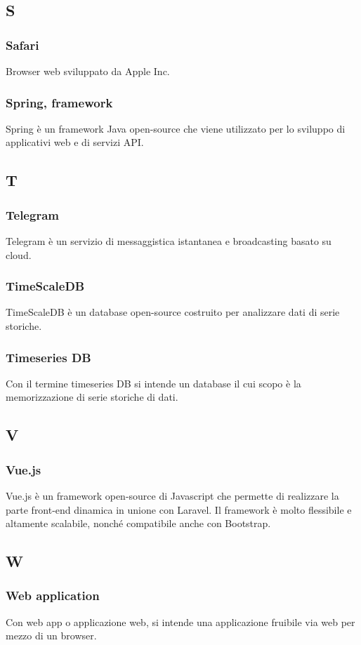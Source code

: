 \subsection{S}
\subsubsection{Safari}
Browser web sviluppato da Apple Inc.
\subsubsection{Spring, framework}  Spring è un framework Java open-source che viene utilizzato per lo sviluppo di applicativi web e di servizi API.
\subsection{T}
\subsubsection{Telegram}  Telegram è un servizio di messaggistica istantanea e broadcasting basato su cloud.
\subsubsection{TimeScaleDB}  TimeScaleDB è un database open-source costruito per analizzare dati di serie storiche.
\subsubsection{Timeseries DB}  Con il termine timeseries DB si intende un database il cui scopo è la memorizzazione di serie storiche di dati.
\subsection{V}
\subsubsection{Vue.js}  Vue.js è un framework open-source di Javascript che permette di realizzare la parte front-end dinamica in unione con Laravel. Il framework è molto flessibile e altamente scalabile, nonché compatibile anche con Bootstrap.
\subsection{W}
\subsubsection{Web application}
Con web app o applicazione web, si intende una applicazione fruibile via web per mezzo di un browser.